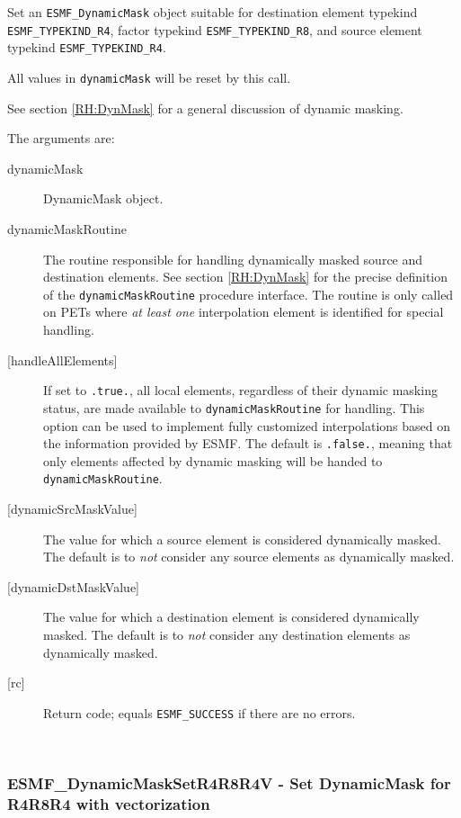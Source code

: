     \label{api:DynamicMaskSetR8R8R8}
     Set an {\tt ESMF\_DynamicMask} object suitable for 
     destination element typekind {\tt ESMF\_TYPEKIND\_R4},
     factor typekind {\tt ESMF\_TYPEKIND\_R8}, and
     source element typekind {\tt ESMF\_TYPEKIND\_R4}.
     
     All values in {\tt dynamicMask} will be reset by this call.
  
     See section \ref{RH:DynMask} for a general discussion of dynamic masking.
  
     The arguments are:
     \begin{description}
     \item[dynamicMask] 
       DynamicMask object.
     \item [dynamicMaskRoutine]
       The routine responsible for handling dynamically masked source and 
       destination elements. See section \ref{RH:DynMask} for the precise
       definition of the {\tt dynamicMaskRoutine} procedure interface.
       The routine is only called on PETs where {\em at least one} interpolation 
       element is identified for special handling.
     \item [{[handleAllElements]}]
       If set to {\tt .true.}, all local elements, regardless of their dynamic
       masking status, are made available to {\tt dynamicMaskRoutine} for
       handling. This option can be used to implement fully customized
       interpolations based on the information provided by ESMF.
       The default is {\tt .false.}, meaning that only elements affected by
       dynamic masking will be handed to {\tt dynamicMaskRoutine}.
     \item [{[dynamicSrcMaskValue]}]
       The value for which a source element is considered dynamically
       masked.
       The default is to {\em not} consider any source elements as
       dynamically masked.
     \item [{[dynamicDstMaskValue]}]
       The value for which a destination element is considered dynamically
       masked.
       The default is to {\em not} consider any destination elements as
       dynamically masked.
     \item[{[rc]}] 
       Return code; equals {\tt ESMF\_SUCCESS} if there are no errors.
     \end{description}
   
 
\mbox{}\hrulefill\ 
 
\subsubsection [ESMF\_DynamicMaskSetR4R8R4V] {ESMF\_DynamicMaskSetR4R8R4V - Set DynamicMask for R4R8R4 with vectorization}


